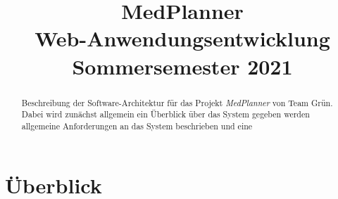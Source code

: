 \documentclass[conference]{IEEEtran}
\begin{document}
\title{MedPlanner\\
{\large Web-Anwendungsentwicklung Sommersemester 2021}
}

\author{
\and
{}
\and
{}
\and
{}
\and
{}
}

\maketitle

\begin{abstract}
Beschreibung der Software-Architektur für das Projekt \textit{MedPlanner} von Team Grün. Dabei wird zunächst allgemein ein Überblick über das System gegeben werden allgemeine Anforderungen an das System beschrieben und eine 
\end{abstract}



\section{Überblick}
\end{document}
